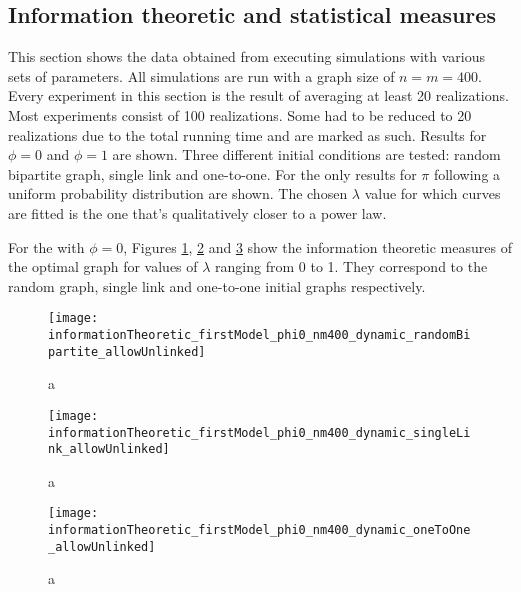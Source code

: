 \subsection{Information theoretic and statistical measures}
\label{sec:results_new_other}

This section shows the data obtained from executing simulations with various sets of parameters.
All simulations are run with a graph size of $n=m=400$.
Every experiment in this section is the result of averaging at least 20 realizations.
Most experiments consist of 100 realizations.
Some had to be reduced to 20 realizations due to the total running time and are marked as such.
Results for $\phi=0$ and $\phi=1$ are shown.
Three different initial conditions are tested: random bipartite graph, single link and one-to-one.
For the \secondmodel{} only results for $\pi$ following a uniform probability distribution are shown.
The chosen $\lambda$ value for which curves are fitted is the one that's qualitatively closer to a power law.

For the \firstmodel{} with $\phi=0$, Figures \ref{fig:informationTheoretic_firstModel_phi0_nm400_dynamic_randomBipartite_allowUnlinked}, \ref{fig:informationTheoretic_firstModel_phi0_nm400_dynamic_singleLink_allowUnlinked} and \ref{fig:informationTheoretic_firstModel_phi0_nm400_dynamic_oneToOne_allowUnlinked} show the information theoretic measures of the optimal graph for values of $\lambda$ ranging from 0 to 1.
They correspond to the random graph, single link and one-to-one initial graphs respectively.

\begin{figure}
  \centering
  \texttt{[image: informationTheoretic\_firstModel\_phi0\_nm400\_dynamic\_randomBipartite\_allowUnlinked]}
  \caption{a}
  \label{fig:informationTheoretic_firstModel_phi0_nm400_dynamic_randomBipartite_allowUnlinked}
\end{figure}

\begin{figure}
  \centering
  \texttt{[image: informationTheoretic\_firstModel\_phi0\_nm400\_dynamic\_singleLink\_allowUnlinked]}
  \caption{a}
  \label{fig:informationTheoretic_firstModel_phi0_nm400_dynamic_singleLink_allowUnlinked}
\end{figure}

\begin{figure}
  \centering
  \texttt{[image: informationTheoretic\_firstModel\_phi0\_nm400\_dynamic\_oneToOne\_allowUnlinked]}
  \caption{a}
  \label{fig:informationTheoretic_firstModel_phi0_nm400_dynamic_oneToOne_allowUnlinked}
\end{figure}

